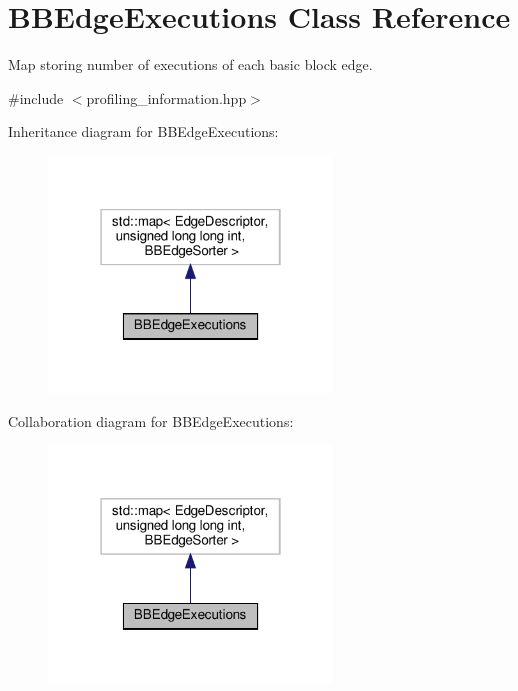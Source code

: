 \hypertarget{classBBEdgeExecutions}{}\section{B\+B\+Edge\+Executions Class Reference}
\label{classBBEdgeExecutions}


Map storing number of executions of each basic block edge.  




{\ttfamily \#include $<$profiling\+\_\+information.\+hpp$>$}



Inheritance diagram for B\+B\+Edge\+Executions\+:
\nopagebreak
\begin{figure}[H]
\begin{center}
\leavevmode
\includegraphics[width=214pt]{dd/d59/classBBEdgeExecutions__inherit__graph}
\end{center}
\end{figure}


Collaboration diagram for B\+B\+Edge\+Executions\+:
\nopagebreak
\begin{figure}[H]
\begin{center}
\leavevmode
\includegraphics[width=214pt]{da/d0e/classBBEdgeExecutions__coll__graph}
\end{center}
\end{figure}
